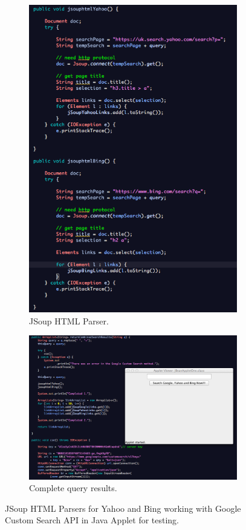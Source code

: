 \documentclass[a4paper, 11pt]{article}
\begin{document}
\begin{figure}[H]
\centering
\begin{subfigure}{.5\textwidth}
  \centering
  \includegraphics[width=.7\linewidth]{htmlParsers}
  \caption{JSoup HTML Parser.}
\end{subfigure}%
\begin{subfigure}{.5\textwidth}
  \centering
  \includegraphics[width=.7\linewidth]{Applet}
  \caption{Complete query results.}
\end{subfigure}
\caption{JSoup HTML Parsers for Yahoo and Bing working with Google Custom Search API in Java Applet for testing.}
\label{AppletFig}
\end{figure}
\end{document}
